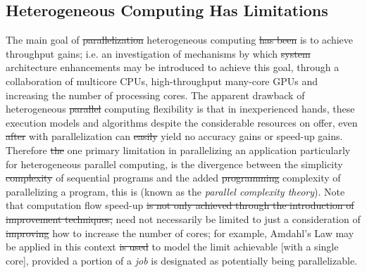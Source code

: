 \documentclass[10pt]{article}[draft]
\begin{document}
\subsection{Heterogeneous Computing Has Limitations}
The main goal of \st{parallelization} heterogeneous computing \st{has been} is to achieve throughput gains; i.e. an investigation of mechanisms by which \st{system} architecture enhancements may be introduced to achieve this goal, through a collaboration of multicore CPUs, high-throughput many-core GPUs and increasing the number of processing cores. The apparent drawback of heterogeneous \st{parallel} computing flexibility is that in inexperienced hands, these execution models {and algorithms despite the considerable resources on offer}, even \st{after} with parallelization can \st{easily} yield no accuracy gains or speed-up gains. Therefore \st{the} one primary limitation in parallelizing an application particularly for heterogeneous parallel computing, is the divergence between the simplicity \st{complexity} of sequential programs and the added \st{programming} complexity of parallelizing a program, this is (known as the \emph{parallel complexity theory}). Note that computation flow speed-up \st{is not only achieved through the introduction of improvement techniques,} need not necessarily be limited to just a consideration of \st{improving} how to increase the number of cores; for example, Amdahl’s Law may be applied in this context \st{is used} to model the limit achievable [with a single core], provided a portion of a \emph{job} is designated as potentially being parallelizable. 
		
\end{document}
